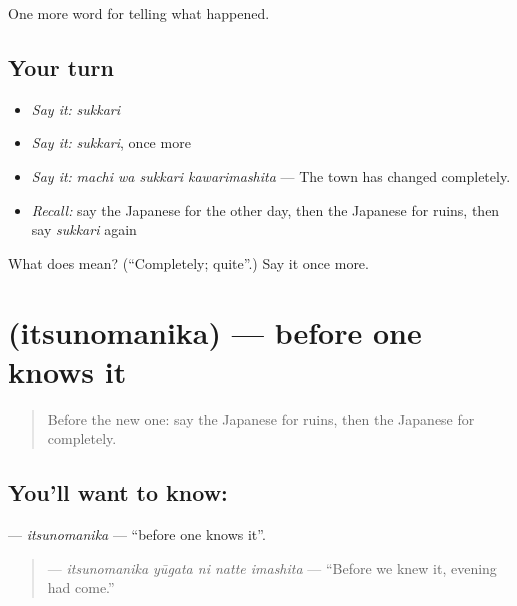 \begin{grammarlens}[title={What you've built}]
One more word for telling what happened.
\end{grammarlens}

\subsection*{Your turn}
\begin{itemize}
\raggedright
  \item \emph{Say it:} \emph{sukkari}
  \item \emph{Say it:} \emph{sukkari}, once more
  \item \emph{Say it:} \emph{machi wa sukkari kawarimashita} — The town has changed completely.
  \item \emph{Recall:} say the Japanese for the other day, then the Japanese for ruins, then say \emph{sukkari} again
\end{itemize}

\begin{tcolorbox}[breakable,colback=teal!4,colframe=teal!35!black,title={Before you move on}]
What does  mean? (\textquotedblleft{}Completely; quite\textquotedblright{}.) Say it once more.
\end{tcolorbox}
\section[\texorpdfstring{\ja{いつのまにか} (itsunomanika)}{いつのまにか (itsunomanika)}]{ (itsunomanika) — before one knows it}

\label{lesson:JA-C314-itsunomanika}



\begin{quote}
Before the new one: say the Japanese for ruins, then the Japanese for completely.
\end{quote}

\subsection*{You'll want to know: }
\textbf{} — \emph{itsunomanika} — \textquotedblleft{}before one knows it\textquotedblright{}.

\begin{quote}
\textbf{  } — \emph{itsunomanika yūgata ni natte imashita} — \textquotedblleft{}Before we knew it, evening had come.\textquotedblright{}
\end{quote}

